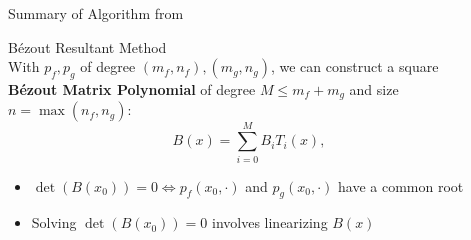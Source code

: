 \documentclass[final]{beamer}
\begin{document}
\begin{frame}{}
\begin{columns}[t]
\begin{column}{.31\linewidth}
\begin{block}{Summary of Algorithm from \cite{nakatsukasa_2013}}
\begin{itemize}
\end{itemize}
{\color{numhypRed} B\'{e}zout Resultant Method}\\
With $p_f,p_g$ of degree $(m_f,n_f),(m_g,n_g)$, we can construct a square {\bf B\'{e}zout Matrix Polynomial} of degree $M\leq m_f+m_g$ and size $n = \max(n_f,n_g)$:
$$B(x) = \sum_{i=0}^{M}B_iT_i(x),$$
\begin{itemize}
\item $\det\left(B(x_0)\right)=0\iff p_f(x_0,\cdot)$ and $p_g(x_0,\cdot)$ have a common root
\item Solving $\det\left(B(x_0)\right)=0$ involves linearizing $B(x)$ 
\end{itemize}
\end{block}



\end{column}

    \begin{column}{.31\linewidth}

%


\end{column}
\end{columns}
\end{frame}
\end{document}
